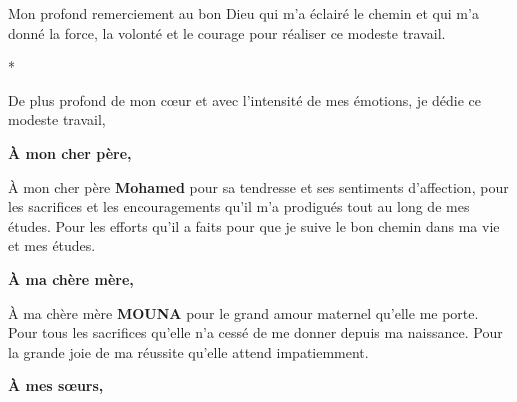 \begin{center}
\vspace*{1cm}

\begin{minipage}{0.75\textwidth}
\centering
Mon profond remerciement au bon Dieu qui m'a éclairé le chemin et qui m'a donné la force, la volonté et le courage pour réaliser ce modeste travail.
\end{minipage}

\vspace{0.8cm}

*\,\*\,\*\,\*\,\*\,\*\,\*\,

\vspace{0.8cm}

\begin{minipage}{0.75\textwidth}
\centering
De plus profond de mon cœur et avec l'intensité de mes émotions, je dédie ce modeste travail,
\end{minipage}

\vspace{0.8cm}

{\large\bfseries À mon cher père,}

\vspace{0.4cm}

\begin{minipage}{0.75\textwidth}
\centering
À mon cher père \textbf{Mohamed} pour sa tendresse et ses sentiments d'affection, pour les sacrifices et les encouragements qu'il m'a prodigués tout au long de mes études. Pour les efforts qu'il a faits pour que je suive le bon chemin dans ma vie et mes études.
\end{minipage}

\vspace{0.8cm}

{\large\bfseries À ma chère mère,}

\vspace{0.4cm}

\begin{minipage}{0.75\textwidth}
\centering
À ma chère mère \textbf{MOUNA} pour le grand amour maternel qu'elle me porte. Pour tous les sacrifices qu'elle n'a cessé de me donner depuis ma naissance. Pour la grande joie de ma réussite qu'elle attend impatiemment.
\end{minipage}

\vspace{0.8cm}

{\large\bfseries À mes sœurs,}

\vspace{0.4cm}


\end{center}
